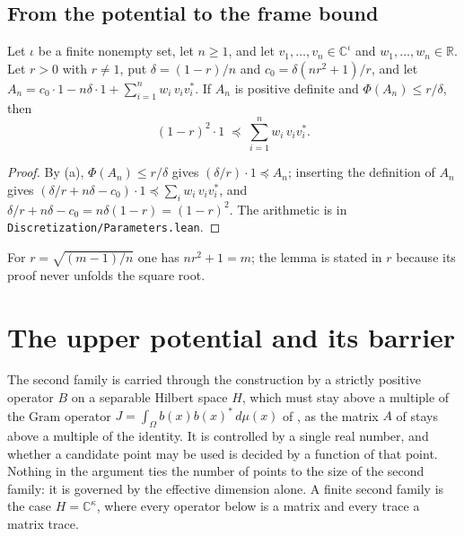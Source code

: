 \section{From the potential to the frame bound}

\begin{lemma}
\label{lem:lower-frame-bound}
\leanok
{}
Let $\iota$ be a finite nonempty set, let $n \geq 1$, and let
$v_1, \dots, v_n \in \mathbb{C}^{\iota}$ and $w_1, \dots, w_n \in \mathbb{R}$. Let $r > 0$
with $r \neq 1$, put $\delta = (1 - r)/n$ and $c_0 = \delta (n r^2 + 1)/r$, and let
$A_n = c_0 \cdot 1 - n \delta \cdot 1 + \sum_{i=1}^n w_i \, v_i v_i^*$. If $A_n$ is
positive definite and $\Phi(A_n) \leq r / \delta$, then
\[
  (1 - r)^2 \cdot 1 \; \preceq \; \sum_{i=1}^n w_i \, v_i v_i^* .
\]
\end{lemma}

\begin{proof}
\leanok
{}
By (a), $\Phi(A_n) \leq r/\delta$ gives
$(\delta / r) \cdot 1 \preceq A_n$; inserting the definition of $A_n$ gives
$(\delta/r + n\delta - c_0) \cdot 1 \preceq \sum_i w_i \, v_i v_i^*$, and
$\delta/r + n\delta - c_0 = n \delta (1 - r) = (1 - r)^2$. The arithmetic is in
\texttt{Discretization/Parameters.lean}.
\end{proof}

For $r = \sqrt{(m-1)/n}$ one has $n r^2 + 1 = m$; the lemma is stated in $r$ because its
proof never unfolds the square root.

\chapter{The upper potential and its barrier}
\label{ch:upper-barrier}

The second family is carried through the construction by a strictly positive operator $B$
on a separable Hilbert space $H$, which must stay above a multiple of the Gram operator
$J = \int_\Omega b(x) b(x)^* \, d\mu(x)$ of , as the matrix $A$ of
 stays above a multiple of the identity. It is controlled by a single real
number, and whether a candidate point may be used is decided by a function of that point.
Nothing in the argument ties the number of points to the size of the second family: it is
governed by the effective dimension alone. A finite second family is the case
$H = \mathbb{C}^{\kappa}$, where every operator below is a matrix and every trace a matrix
trace.

